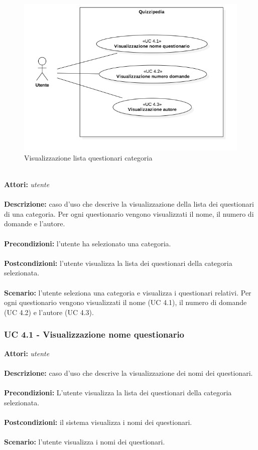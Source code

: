 \documentclass[a4paper,11pt]{article}
\begin{document}
\begin{figure}[h!]
\centering
\includegraphics[scale=0.6]{../immagini/UC4.png}
\caption{Visualizzazione lista questionari categoria}
\end{figure}
\ \\
\textbf{Attori:} \textit{utente}
\\ \\
\textbf{Descrizione:} caso d'uso che descrive la visualizzazione della lista dei questionari di una categoria. Per ogni questionario vengono visualizzati il nome, il numero di domande e l'autore.\\
\\
\textbf{Precondizioni:} l'utente ha selezionato una categoria.\\
\\
\textbf{Postcondizioni:} l’utente visualizza la lista dei questionari della categoria selezionata.\\
\\
\textbf{Scenario:} l’utente seleziona una categoria e visualizza i questionari relativi. Per ogni questionario vengono visualizzati il nome (UC 4.1), il numero di domande (UC 4.2) e l'autore (UC 4.3).\\


\subsubsection{UC 4.1 - Visualizzazione nome questionario}

\textbf{Attori:} \textit{utente}
\\ \\
\textbf{Descrizione:} caso d'uso che descrive la visualizzazione dei nomi dei questionari.\\
\\
\textbf{Precondizioni:} L'utente visualizza la lista dei questionari della categoria selezionata.\\
\\
\textbf{Postcondizioni:} il sistema visualizza i nomi dei questionari.\\
\\
\textbf{Scenario:} l’utente visualizza i nomi dei questionari.\\
\end{document}
